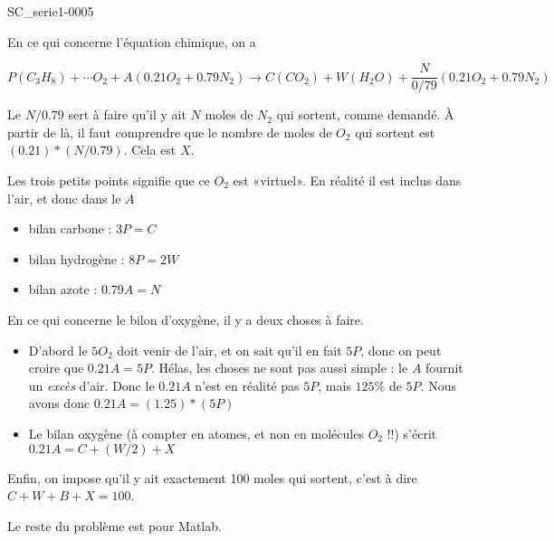 \begin{corrige}{SC_serie1-0005}

	En ce qui concerne l'équation chimique, on a

	\begin{equation}
		P(C_3H_8) + \cdots O_2 + A(0.21 O_2 + 0.79 N_2) \to C (CO_2) + W(H_2O) + \frac{ N }{ 0/79 } (0.21 O_2 + 0.79 N_2)
	\end{equation}

Le $N/0.79$ sert à faire qu'il y ait $N$ moles de $N_2$ qui sortent, comme demandé. À partir de là, il faut comprendre que le nombre de moles de $O_2$ qui sortent est $(0.21)*(N/0.79)$. Cela est $X$.

 Les trois petits points signifie que ce $O_2$ est «virtuel». En réalité il est inclus dans l'air, et donc dans le $A$

\begin{itemize}
	\item 
bilan carbone : $3P = C$
\item
 bilan hydrogène : $8P = 2W$
 \item
 bilan azote : $0.79 A = N$
\end{itemize}

En ce qui concerne le bilon d'oxygène, il y a deux choses à faire.
\begin{itemize}
	\item  D'abord le $5O_2$ doit venir de l'air, et on sait qu'il en fait $5P$, donc on peut croire que $0.21A = 5P$. Hélas, les choses ne sont pas aussi simple : le $A$ fournit un \emph{excès} d'air. Donc le $0.21A$ n'est en réalité pas $5P$, mais $125\%$ de $5P$. Nous avons donc $0.21A = (1.25)*(5P)$
	\item Le bilan oxygène (à compter en atomes, et non en molécules $O_2$ !!) s'écrit $0.21 A = C+(W/2)+X$
\end{itemize}
Enfin, on impose qu'il y ait exactement 100 moles qui sortent, c'est à dire $C+W+B+X=100$.

Le reste du problème est pour Matlab.



\end{corrige}
